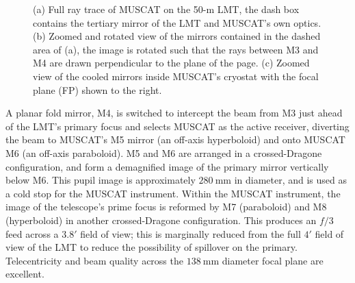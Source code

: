 \documentclass{spie}
\begin{document}
\begin{figure}[b]
{\label{fig:RaysM3}}
\hspace{0.1\textwidth}
\caption{(a) Full ray trace of MUSCAT on the 50-m LMT, the dash box contains the tertiary mirror of the LMT and MUSCAT's own optics. (b) Zoomed and rotated view of the mirrors contained in the dashed area of (a), the image is rotated such that the rays between M3 and M4 are drawn perpendicular to the plane of the page. (c) Zoomed view of the cooled mirrors inside MUSCAT's cryostat with the focal plane (FP) shown to the right.}\label{fig:Rays}
\end{figure}
\par
A planar fold mirror, M4, is switched to intercept the beam from M3 just ahead of the LMT's primary focus and selects MUSCAT as the active receiver, diverting the beam to MUSCAT's M5 mirror (an off-axis hyperboloid) and onto MUSCAT M6 (an off-axis paraboloid). M5 and M6 are arranged in a crossed-Dragone configuration, and form a demagnified image of the primary mirror vertically below M6. This pupil image is approximately $280~\si{\milli\metre}$ in diameter, and is used as a cold stop for the MUSCAT instrument. Within the MUSCAT instrument, the image of the telescope's prime focus is reformed by M7 (paraboloid) and M8 (hyperboloid) in another crossed-Dragone configuration. This produces an $f/3$ feed  across a $3.8\si{\arcminute}$ field of view; this is marginally reduced from the full $4\si{\arcminute}$ field of view of the LMT to reduce the possibility of spillover on the primary. Telecentricity and beam quality across the $138~\si{\milli\metre}$ diameter focal plane are excellent.
\end{document}
